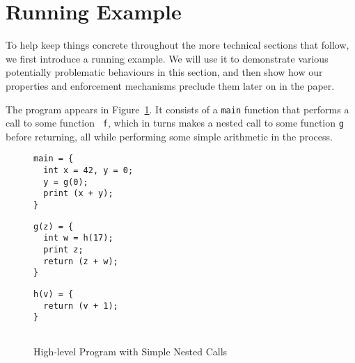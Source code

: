 \documentclass[acmsmall,review,anonymous]{acmart}\settopmatter{printfolios=true,printccs=false,printacmref=false}
\begin{document}
\section{Running Example}
\label{sec:running-example}

To help keep things concrete throughout the more technical sections
that follow, we first introduce a running example. We will
use it to demonstrate various potentially problematic
behaviours in this section, and then show how our properties and
enforcement mechanisms preclude them later on in the paper.

The program appears in Figure~\ref{fig:running-program}. It consists
of a {\tt main} function that performs a call to some function {\tt
  f}, which in turns makes a nested call to some function {\tt g}
before returning, all while performing some simple arithmetic
in the process.

\begin{figure}[b]
  \begin{centering}
    \begin{minipage}{.3\textwidth}
\begin{verbatim}
main = {
  int x = 42, y = 0;
  y = g(0);
  print (x + y);
}
\end{verbatim}
    \end{minipage}
    \begin{minipage}{.3\textwidth}
\begin{verbatim}
g(z) = {
  int w = h(17);
  print z;
  return (z + w);
}
\end{verbatim}
    \end{minipage}
    \begin{minipage}{.3\textwidth}
\begin{verbatim}
h(v) = {
  return (v + 1);
}


\end{verbatim}
    \end{minipage}
\end{centering}
\caption{High-level Program with Simple Nested Calls}
\label{fig:running-program}
\end{figure}


\newcommand*{\add}{\textsc{add}}
\newcommand*{\addi}{\textsc{addi}}
\newcommand*{\sw}{\textsc{sw}}
\newcommand*{\lw}{\textsc{lw}}
\newcommand*{\jal}{\textsc{jal}}
\newcommand*{\jalr}{\textsc{jalr}}
\newcommand*{\rsp}{\textsc{sp}}
\newcommand*{\rra}{\textsc{ra}}
\newcommand*{\rout}{\textsc{out}}

\setcounter{pcctr}{0}
\newcommand*{\row}[4]{
  \thepcctr & \stepcounter{pcctr} #1 & #2 & #3 & \text{#4}\\
}
\newcommand*{\tracerow}[5]{
  #1 & #2 & #3 & #4 & \text{#5}\\
}
\newcommand*{\summary}[6]{
\[
\begin{array}{cccccc}
  \PCname = #1 & r_0 = #2 & \rra = #3 & \rsp = #4 & r_4 = #5 & r_5 = #6
\end{array}
\]
}    
\newcommand{\negate}{\textrm{-}}
\end{document}
